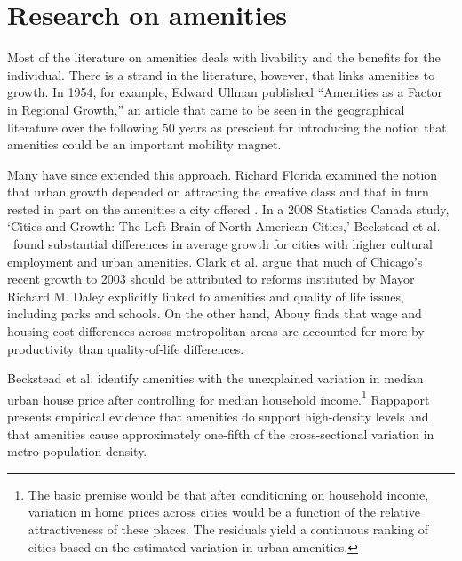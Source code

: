 \section{Research on amenities}
Most of the literature on amenities deals with livability and the benefits for the individual. There is a strand in the literature, however, that links amenities to growth. In 1954, for example, Edward Ullman \cite{ullmanAmenitiesFactorRegional1954} published  ``Amenities as a Factor in Regional Growth,'' an article that came to be seen in the geographical literature over the following 50 years as prescient \cite{walcottCommentsEdwardUllman2010} for introducing the notion that amenities could be an important mobility magnet. 

Many have since extended this approach. Richard Florida examined the notion that urban growth depended on attracting the creative class and that in turn rested in part on the amenities a city offered %
\cite{floridaCreativeClassEconomic2014, floridaEconomicGeographyTalent2002, floridaCompetingAgeTalent2005}. In a 2008  Statistics Canada study, `Cities and Growth: The Left Brain of North American Cities,' Beckstead et al. \ found substantial differences in average growth for cities with higher cultural employment and urban amenities.  Clark et al. \cite{clarkAmenitiesDriveUrban2002} argue that much of Chicago's recent growth to 2003  should be attributed to reforms instituted by Mayor Richard M.  Daley explicitly linked to amenities and quality of life issues, including parks and schools. On the other hand, Abouy \cite{albouyWhatAreCities2016} finds that wage and housing cost differences across metropolitan areas are accounted for more by productivity than quality-of-life differences. 

Beckstead et al.  \cite{becksteadCitiesGrowthLeft2008} identify amenities with the unexplained variation in median urban house price after controlling for median household income.\footnote{  The basic premise would be that after conditioning on household income, variation in home prices across cities would be a function of the relative attractiveness of these places. The residuals yield a continuous ranking of cities based on the estimated variation in urban amenities.} Rappaport \cite{rappaportConsumptionAmenitiesCity2008} presents empirical evidence that amenities do support high-density levels and that amenities cause approximately one-fifth of the cross-sectional variation in metro population density. 

